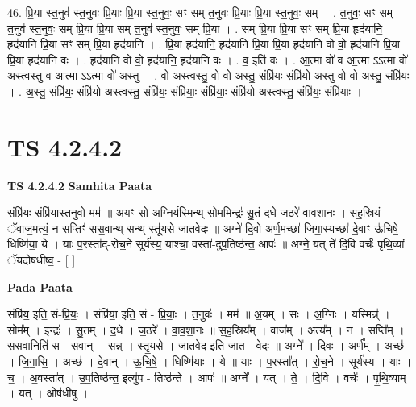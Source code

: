 \documentclass[17pt]{extarticle}
\begin{document}
46. प्रि॒या स्त॒नुव॑ स्त॒नुवः॑ प्रि॒याः प्रि॒या स्त॒नुवः॒ सꣳ सम् त॒नुवः॑ प्रि॒याः प्रि॒या स्त॒नुवः॒ सम् । . त॒नुवः॒ सꣳ सम् त॒नुव॑ स्त॒नुवः॒ सम् प्रि॒या प्रि॒या सम् त॒नुव॑ स्त॒नुवः॒ सम् प्रि॒या । . सम् प्रि॒या प्रि॒या सꣳ सम् प्रि॒या हृद॑यानि॒ हृद॑यानि प्रि॒या सꣳ सम् प्रि॒या हृद॑यानि । . प्रि॒या हृद॑यानि॒ हृद॑यानि प्रि॒या प्रि॒या हृद॑यानि वो वो॒ हृद॑यानि प्रि॒या प्रि॒या हृद॑यानि वः । . हृद॑यानि वो वो॒ हृद॑यानि॒ हृद॑यानि वः । . व॒ इति॑ वः । . आ॒त्मा वो॑ व आ॒त्मा ऽऽत्मा वो॑ अस्त्वस्तु व आ॒त्मा ऽऽत्मा वो॑ अस्तु । . वो॒ अ॒स्त्व॒स्तु॒ वो॒ वो॒ अ॒स्तु॒ संप्रि॑यः॒ संप्रि॑यो अस्तु वो वो अस्तु॒ संप्रि॑यः । . अ॒स्तु॒ संप्रि॑यः॒ संप्रि॑यो अस्त्वस्तु॒ संप्रि॑यः॒ संप्रि॑याः॒ संप्रि॑याः॒ संप्रि॑यो अस्त्वस्तु॒ संप्रि॑यः॒ संप्रि॑याः । \newline
\pagebreak
{}

\section{ TS 4.2.4.2 }

\textbf{TS 4.2.4.2 } \newline
\textbf{Samhita Paata} \newline

संप्रि॑यः॒ संप्रि॑यास्त॒नुवो॒ मम॑ ॥ अ॒यꣳ सो अ॒ग्निर्यस्मि॒न्थ्-सोम॒मिन्द्रः॑ सु॒तं द॒धे ज॒ठरे॑ वावशा॒नः । स॒ह॒स्रियं॒ ॅवाज॒मत्यं॒ न सप्तिꣳ॑ सस॒वान्थ्-सन्थ्-स्तू॑यसे जातवेदः ॥ अग्ने॑ दि॒वो अर्ण॒मच्छा॑ जिगा॒स्यच्छा॑ दे॒वाꣳ ऊ॑चिषे॒ धिष्णि॑या॒ ये । याः प॒रस्ता᳚द्-रोच॒ने सूर्य॑स्य॒ याश्चा॒ वस्ता॑-दुप॒तिष्ठ॑न्त॒ आपः॑ ॥ अग्ने॒ यत् ते॑ दि॒वि वर्चः॑ पृथि॒व्यां ॅयदोष॑धीष्व॒ - [  ] \newline

\textbf{Pada Paata} \newline

संप्रि॑य॒ इति॒ सं-प्रि॒यः॒ । संप्रि॑या॒ इति॒ सं - प्रि॒याः॒ । त॒नुवः॑ । मम॑ ॥ अ॒यम् । सः । अ॒ग्निः । यस्मिन्न्॑ । सोम᳚म् । इन्द्रः॑ । सु॒तम् । द॒धे । ज॒ठरे᳚ । वा॒व॒शा॒नः ॥ स॒ह॒स्रिय᳚म् । वाज᳚म् । अत्य᳚म् । न । सप्ति᳚म् । स॒स॒वानिति॑ स - स॒वान् । सन्न् । स्तृ॒य॒से॒ । जा॒त॒वे॒द॒ इति॑ जात - वे॒दः॒ ॥ अग्ने᳚ । दि॒वः । अर्ण᳚म् । अच्छ॑ । जि॒गा॒सि॒ । अच्छ॑ । दे॒वान् । ऊ॒चि॒षे॒ । धिष्णि॑याः । ये ॥ याः । प॒रस्ता᳚त् । रो॒च॒ने । सूर्य॑स्य । याः । च॒ । अ॒वस्ता᳚त् । उ॒प॒तिष्ठ॑न्त॒ इत्यु॑प - तिष्ठ॑न्ते । आपः॑ ॥ अग्ने᳚ । यत् । ते॒ । दि॒वि । वर्चः॑ । पृ॒थि॒व्याम् । यत् । ओष॑धीषु ।  \newline
\end{document}
